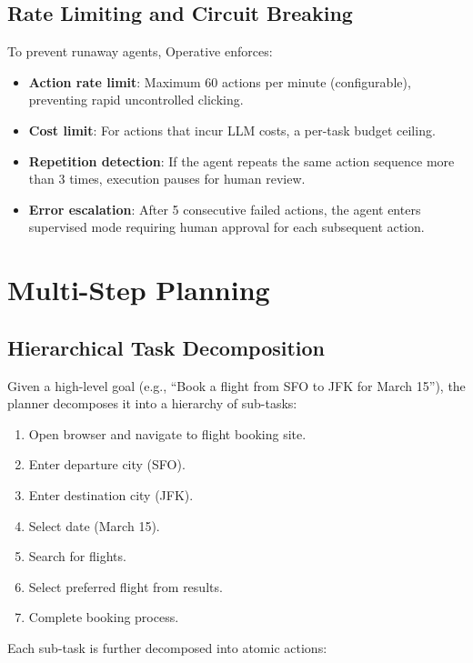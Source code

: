\documentclass[11pt,twocolumn]{article}
\begin{document}
\subsection{Rate Limiting and Circuit Breaking}

To prevent runaway agents, Operative enforces:

\begin{itemize}[leftmargin=*]
    \item \textbf{Action rate limit}: Maximum 60 actions per minute (configurable), preventing rapid uncontrolled clicking.
    \item \textbf{Cost limit}: For actions that incur LLM costs, a per-task budget ceiling.
    \item \textbf{Repetition detection}: If the agent repeats the same action sequence more than 3 times, execution pauses for human review.
    \item \textbf{Error escalation}: After 5 consecutive failed actions, the agent enters supervised mode requiring human approval for each subsequent action.
\end{itemize}

\section{Multi-Step Planning}
\label{sec:planning}

\subsection{Hierarchical Task Decomposition}

Given a high-level goal (e.g., ``Book a flight from SFO to JFK for March 15''), the planner decomposes it into a hierarchy of sub-tasks:

\begin{enumerate}[leftmargin=*]
    \item Open browser and navigate to flight booking site.
    \item Enter departure city (SFO).
    \item Enter destination city (JFK).
    \item Select date (March 15).
    \item Search for flights.
    \item Select preferred flight from results.
    \item Complete booking process.
\end{enumerate}

Each sub-task is further decomposed into atomic actions:
\end{document}
